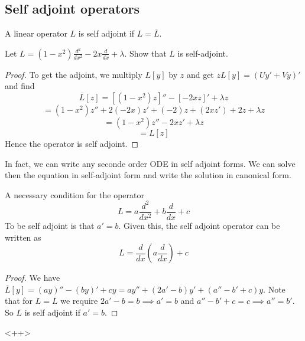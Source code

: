 \subsection{Self adjoint operators}
\begin{definition}
  A linear operator $L$ is self adjoint if $L=\overline{L}$.
  \label{def:selfAdjOp}
\end{definition}
\begin{example}
  Let $L=(1-x^2)\frac{d^2}{dx^2}- 2x\frac{d}{dx} + \lambda$.
  Show that $L$ is self-adjoint.
\end{example}
\begin{proof}
To get the adjoint, we multiply $L[y]$ by $z$ and get $zL[y]=(Uy'+Vy)'$ and find
\[\overline{L}[z]=[(1-x^2)z]'' - [-2xz]'+\lambda z\]
\[= (1-x^2)z'' + 2(-2x)z' + (-2)z + (2xz')+2z +\lambda z\]
\[=(1-x^2)z''-2xz'+\lambda z\]
\[=L[z]\]
Hence the operator is self adjoint.
\end{proof}

In fact, we can write any seconde order ODE in self adjoint forms. We can solve then the
equation in self-adjoint form and write the solution in canonical form.


\begin{theorem}
  A necessary condition for the operator 
  \[L=a\frac{d^2}{dx^2} +b\frac{d}{dx}+c\]
  To be self adjoint is that $a'=b$. Given this, the self adjoint operator can be written
  as 
  \[L=\frac{d}{dx}(a\frac{d}{dx})+c\]
  \label{<+label+>}
\end{theorem}
\begin{proof}
  We have $\overline{L}[y]= (ay)''-(by)'+cy = ay''+(2a'-b)y'+ (a''-b'+c)y$. Note that for
  $L=\overline{L}$ we require $2a'-b=b\implies a'=b$ and $a''-b'+c=c\implies a''=b'$. So
  $L$ is self adjoint if $a'=b$.

\end{proof}<++>
